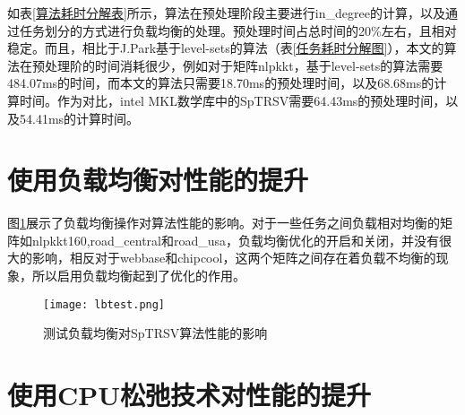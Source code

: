\begin{table}[htbp]
    \scriptsize
    \caption{算法耗时分解表}
    \label{算法耗时分解表}
\end{table}

如表\ref{算法耗时分解表}所示，算法在预处理阶段主要进行in\_degree的计算，以及通过任务划分的方式进行负载均衡的处理。预处理时间占总时间的20\%左右，且相对稳定。而且，相比于J.Park\cite{park2014sparsifying}基于level-sets的算法（表\ref{任务耗时分解图}），本文的算法在预处理阶的时间消耗很少，例如对于矩阵nlpkkt，基于level-sets的算法需要484.07ms的时间，而本文的算法只需要18.70ms的预处理时间，以及68.68ms的计算时间。作为对比，intel MKL数学库中的SpTRSV需要64.43ms的预处理时间，以及54.41ms的计算时间。


\section{使用负载均衡对性能的提升}

图\ref{测试负载均衡对SpTRSV算法性能的影响}展示了负载均衡操作对算法性能的影响。对于一些任务之间负载相对均衡的矩阵如nlpkkt160,road\_central和road\_usa，负载均衡优化的开启和关闭，并没有很大的影响，相反对于webbase和chipcool，这两个矩阵之间存在着负载不均衡的现象，所以启用负载均衡起到了优化的作用。

\begin{figure}[htbp]
    \centering
    \texttt{[image: lbtest.png]}
    \caption{测试负载均衡对SpTRSV算法性能的影响}
    \label{测试负载均衡对SpTRSV算法性能的影响}
\end{figure}

\section{使用CPU松弛技术对性能的提升}

